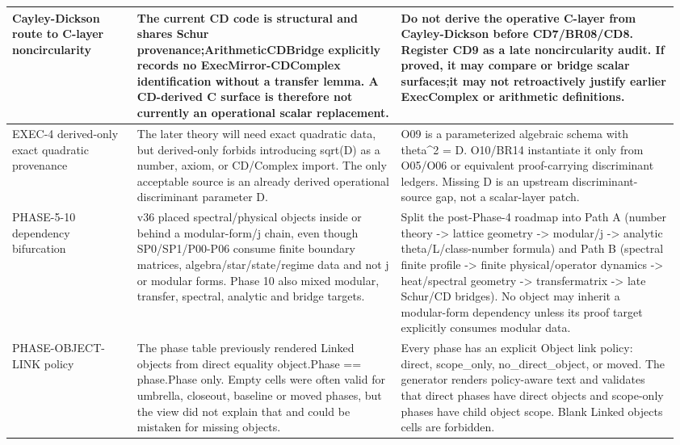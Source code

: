 \begin{longtable}{L{0.18\linewidth} L{0.38\linewidth} L{0.4\linewidth}}
\hline
\addlinespace[0.24em]
Cayley-Dickson route to C-layer noncircularity & The current CD code is structural and shares Schur provenance;\newline ArithmeticCDBridge explicitly records no ExecMirror-CDComplex identification without a transfer lemma. A CD-derived C surface is therefore not currently an operational scalar replacement. & Do not derive the operative C-layer from Cayley-Dickson before CD7/\allowbreak{}BR08/\allowbreak{}CD8. Register CD9 as a late noncircularity audit. If proved, it may compare or bridge scalar surfaces;\newline it may not retroactively justify earlier ExecComplex or arithmetic definitions.\\
\hline
\addlinespace[0.24em]
EXEC-4 derived-only exact quadratic provenance & The later theory will need exact quadratic data, but derived-only forbids introducing sqrt(D) as a number, axiom, or CD/\allowbreak{}Complex import. The only acceptable source is an already derived operational discriminant parameter D. & O09 is a parameterized algebraic schema with theta\textasciicircum{}2 = D. O10/\allowbreak{}BR14 instantiate it only from O05/\allowbreak{}O06 or equivalent proof-carrying discriminant ledgers. Missing D is an upstream discriminant-source gap, not a scalar-layer patch.\\
\hline
\addlinespace[0.24em]
PHASE-5-10 dependency bifurcation & v36 placed spectral/\allowbreak{}physical objects inside or behind a modular-form/\allowbreak{}j chain, even though SP0/\allowbreak{}SP1/\allowbreak{}P00-P06 consume finite boundary matrices, algebra/\allowbreak{}star/\allowbreak{}state/\allowbreak{}regime data and not j or modular forms. Phase 10 also mixed modular, transfer, spectral, analytic and bridge targets. & Split the post-Phase-4 roadmap into Path A (number theory -> lattice geometry -> modular/\allowbreak{}j -> analytic theta/\allowbreak{}L/\allowbreak{}class-number formula) and Path B (spectral finite profile -> finite physical/\allowbreak{}operator dynamics -> heat/\allowbreak{}spectral geometry -> transfermatrix -> late Schur/\allowbreak{}CD bridges). No object may inherit a modular-form dependency unless its proof target explicitly consumes modular data.\\
\hline
\addlinespace[0.24em]
PHASE-OBJECT-LINK policy & The phase table previously rendered Linked objects from direct equality object.Phase == phase.Phase only. Empty cells were often valid for umbrella, closeout, baseline or moved phases, but the view did not explain that and could be mistaken for missing objects. & Every phase has an explicit Object link policy: direct, scope\_only, no\_direct\_object, or moved. The generator renders policy-aware text and validates that direct phases have direct objects and scope-only phases have child object scope. Blank Linked objects cells are forbidden.\\

\end{longtable}
